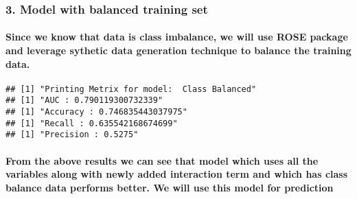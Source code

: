 \documentclass[]{article}
\newenvironment{Shaded}{\begin{snugshade}}{\end{snugshade}}
\newcommand{\DataTypeTok}[1]{\textcolor[rgb]{0.13,0.29,0.53}{#1}}
\newcommand{\DecValTok}[1]{\textcolor[rgb]{0.00,0.00,0.81}{#1}}
\newcommand{\KeywordTok}[1]{\textcolor[rgb]{0.13,0.29,0.53}{\textbf{#1}}}
\newcommand{\NormalTok}[1]{#1}
\newcommand{\OperatorTok}[1]{\textcolor[rgb]{0.81,0.36,0.00}{\textbf{#1}}}
\newcommand{\StringTok}[1]{\textcolor[rgb]{0.31,0.60,0.02}{#1}}
\let\oldparagraph\paragraph
\renewcommand{\paragraph}[1]{\oldparagraph{#1}\mbox{}}
\begin{document}
\hypertarget{model-with-balanced-training-set}{%
\subsubsection{\texorpdfstring{\textbf{3. Model with balanced training
set}}{3. Model with balanced training set}}\label{model-with-balanced-training-set}}

\hypertarget{since-we-know-that-data-is-class-imbalance-we-will-use-rose-package-and-leverage-sythetic-data-generation-technique-to-balance-the-training-data.}{%
\paragraph{Since we know that data is class imbalance, we will use ROSE
package and leverage sythetic data generation technique to balance the
training
data.}\label{since-we-know-that-data-is-class-imbalance-we-will-use-rose-package-and-leverage-sythetic-data-generation-technique-to-balance-the-training-data.}}

\begin{Shaded}
\end{Shaded}

\begin{verbatim}
## [1] "Printing Metrix for model:  Class Balanced"
## [1] "AUC : 0.790119300732339"
## [1] "Accuracy : 0.746835443037975"
## [1] "Recall : 0.635542168674699"
## [1] "Precision : 0.5275"
\end{verbatim}

\hypertarget{from-the-above-results-we-can-see-that-model-which-uses-all-the-variables-along-with-newly-added-interaction-term-and-which-has-class-balance-data-performs-better.-we-will-use-this-model-for-prediction}{%
\paragraph{From the above results we can see that model which uses all
the variables along with newly added interaction term and which has
class balance data performs better. We will use this model for
prediction}\label{from-the-above-results-we-can-see-that-model-which-uses-all-the-variables-along-with-newly-added-interaction-term-and-which-has-class-balance-data-performs-better.-we-will-use-this-model-for-prediction}}
\end{document}
